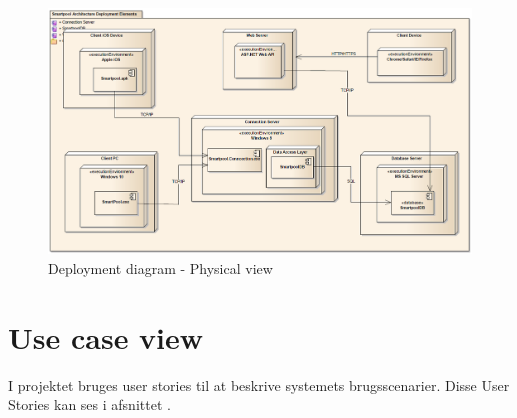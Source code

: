 \begin{figure}
	\centering
	\includegraphics[width=\linewidth]{figs/arkitektur/deploymentView.PNG}
	\caption{Deployment diagram - Physical view}
	\label{fig:deploymentView}
\end{figure}

\section{Use case view}
I projektet bruges user stories til at beskrive systemets brugsscenarier. Disse User Stories kan ses i afsnittet .

